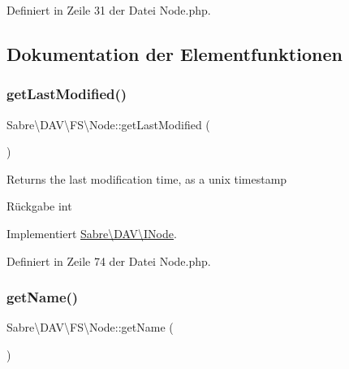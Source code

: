 Definiert in Zeile 31 der Datei Node.\+php.



\subsection{Dokumentation der Elementfunktionen}
\mbox{\label{class_sabre_1_1_d_a_v_1_1_f_s_1_1_node_a3287f7faf6967fecf53a4afdec4d0a4b}} 
\subsubsection{\texorpdfstring{get\+Last\+Modified()}{getLastModified()}}
{\footnotesize\ttfamily Sabre\textbackslash{}\+D\+A\+V\textbackslash{}\+F\+S\textbackslash{}\+Node\+::get\+Last\+Modified (\begin{DoxyParamCaption}{ }\end{DoxyParamCaption})}

Returns the last modification time, as a unix timestamp

\begin{DoxyReturn}{Rückgabe}
int 
\end{DoxyReturn}


Implementiert \mbox{\hyperlink{interface_sabre_1_1_d_a_v_1_1_i_node_a06335f81c7d4ec2c6d9e327c8ce61014}{Sabre\textbackslash{}\+D\+A\+V\textbackslash{}\+I\+Node}}.



Definiert in Zeile 74 der Datei Node.\+php.

\mbox{\label{class_sabre_1_1_d_a_v_1_1_f_s_1_1_node_a9c17fc362b705fbd599512fcb32bafb9}} 
\subsubsection{\texorpdfstring{get\+Name()}{getName()}}
{\footnotesize\ttfamily Sabre\textbackslash{}\+D\+A\+V\textbackslash{}\+F\+S\textbackslash{}\+Node\+::get\+Name (\begin{DoxyParamCaption}{ }\end{DoxyParamCaption})}

